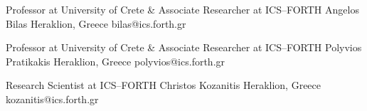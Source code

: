 


\begin{cventries}

  \cventry
    {Professor at University of Crete \& Associate Researcher at ICS--FORTH} %
    {Angelos Bilas} %
    {Heraklion, Greece} %
    {} %
    {
        bilas@ics.forth.gr
    }

  \cventry
    {Professor at University of Crete \& Associate Researcher at ICS--FORTH} %
    {Polyvios Pratikakis} %
    {Heraklion, Greece} %
    {} %
    {
        polyvios@ics.forth.gr
    }


  \cventry
    {Research Scientist at ICS--FORTH} %
    {Christos Kozanitis} %
    {Heraklion, Greece} %
    {} %
    {
        kozanitis@ics.forth.gr
    }

\end{cventries}
